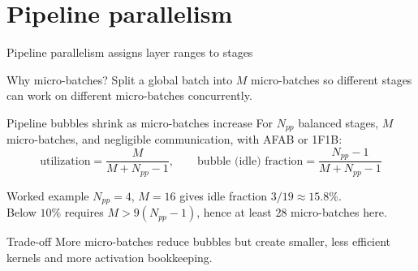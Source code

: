 \documentclass[handout]{beamer}
\begin{document}
\section{Pipeline parallelism}

\begin{frame}{Pipeline parallelism assigns layer ranges to stages}
  \begin{center}
  \end{center}
  \begin{block}{Why micro-batches?}
    Split a global batch into $M$ micro-batches so different stages can work on different micro-batches concurrently.
  \end{block}
\end{frame}

\begin{frame}{Pipeline bubbles shrink as micro-batches increase}
  For $N_{pp}$ balanced stages, $M$ micro-batches, and negligible communication, with AFAB or 1F1B:
  \[
    \text{utilization}=\frac{M}{M+N_{pp}-1},
    \qquad
    \text{bubble (idle) fraction}=\frac{N_{pp}-1}{M+N_{pp}-1}
  \]
  \begin{block}{Worked example}
    $N_{pp}=4$, $M=16$ gives idle fraction $3/19\approx15.8\%$.\\
    Below $10\%$ requires $M>9(N_{pp}-1)$, hence at least 28 micro-batches here.
  \end{block}
  \begin{alertblock}{Trade-off}
    More micro-batches reduce bubbles but create smaller, less efficient kernels and more activation bookkeeping.
  \end{alertblock}
\end{frame}
\end{document}

